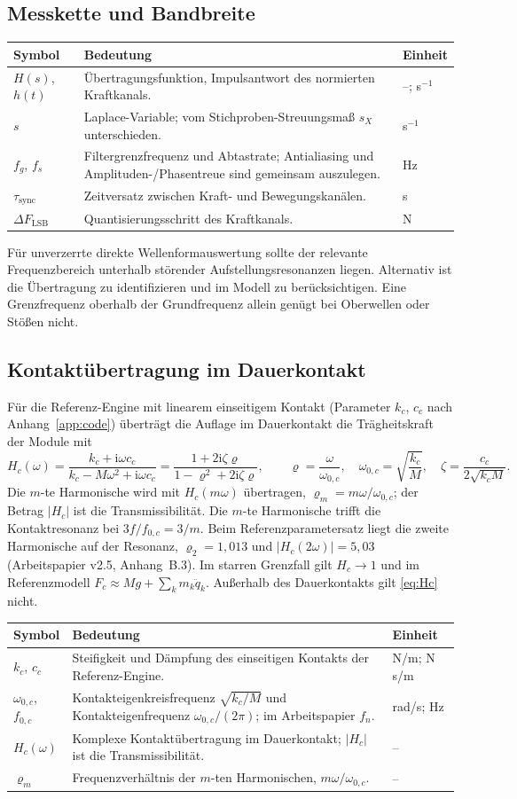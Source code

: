 \documentclass[11pt,a4paper]{article}
\makeatletter
\newenvironment{symtab}{\begin{longtable}{@{}L{.22\textwidth}L{.62\textwidth}L{.12\textwidth}@{}}\toprule\textbf{Symbol}&\textbf{Bedeutung}&\textbf{Einheit}\\\midrule\endhead}{\bottomrule\end{longtable}}
\makeatother
\begin{document}
\subsection{Messkette und Bandbreite}
\begin{symtab}
$H(s)$, $h(t)$&Übertragungsfunktion, Impulsantwort des normierten Kraftkanals.&--; s$^{-1}$\\
$s$&Laplace-Variable; vom Stichproben-Streuungsmaß $s_X$ unterschieden.&s$^{-1}$\\
$f_g$, $f_s$&Filtergrenzfrequenz und Abtastrate; Antialiasing und Amplituden-/Phasentreue sind gemeinsam auszulegen.&Hz\\
$\tau_{\mathrm{sync}}$&Zeitversatz zwischen Kraft- und Bewegungskanälen.&s\\
$\Delta F_{\mathrm{LSB}}$&Quantisierungsschritt des Kraftkanals.&N\\
\end{symtab}
Für unverzerrte direkte Wellenformauswertung sollte der relevante Frequenzbereich unterhalb störender Aufstellungsresonanzen liegen. Alternativ ist die Übertragung zu identifizieren und im Modell zu berücksichtigen. Eine Grenzfrequenz oberhalb der Grundfrequenz allein genügt bei Oberwellen oder Stößen nicht.

\subsection{Kontaktübertragung im Dauerkontakt}\label{sec:kontaktuebertragung}
Für die Referenz-Engine mit linearem einseitigem Kontakt (Parameter $k_c$, $c_c$ nach Anhang~\ref{app:code}) überträgt die Auflage im Dauerkontakt die Trägheitskraft der Module mit
\begin{equation}
H_c(\omega)=\frac{k_c+\mathrm i\omega c_c}{k_c-M\omega^2+\mathrm i\omega c_c}
=\frac{1+2\mathrm i\zeta\varrho}{1-\varrho^2+2\mathrm i\zeta\varrho},\qquad
\varrho=\frac{\omega}{\omega_{0,c}},\quad \omega_{0,c}=\sqrt{\frac{k_c}{M}},\quad \zeta=\frac{c_c}{2\sqrt{k_cM}}.
\label{eq:Hc}
\end{equation}
Die $m$-te Harmonische wird mit $H_c(m\omega)$ übertragen, $\varrho_m=m\omega/\omega_{0,c}$; der Betrag $|H_c|$ ist die Transmissibilität. Die $m$-te Harmonische trifft die Kontaktresonanz bei $3f/f_{0,c}=3/m$. Beim Referenzparametersatz liegt die zweite Harmonische auf der Resonanz, $\varrho_2=1{,}013$ und $|H_c(2\omega)|=5{,}03$ (Arbeitspapier v2.5, Anhang~B.3). Im starren Grenzfall gilt $H_c\to1$ und im Referenzmodell $F_c\approx Mg+\sum_k m_k\ddot q_k$. Außerhalb des Dauerkontakts gilt \eqref{eq:Hc} nicht.
\begin{symtab}
$k_c$, $c_c$&Steifigkeit und Dämpfung des einseitigen Kontakts der Referenz-Engine.&N/m; N s/m\\
$\omega_{0,c}$, $f_{0,c}$&Kontakteigenkreisfrequenz $\sqrt{k_c/M}$ und Kontakteigenfrequenz $\omega_{0,c}/(2\pi)$; im Arbeitspapier $f_n$.&rad/s; Hz\\
$H_c(\omega)$&Komplexe Kontaktübertragung im Dauerkontakt; $|H_c|$ ist die Transmissibilität.&--\\
$\varrho_m$&Frequenzverhältnis der $m$-ten Harmonischen, $m\omega/\omega_{0,c}$.&--\\
\end{symtab}
\end{document}
